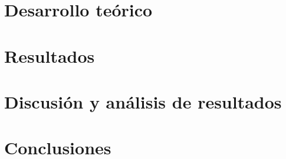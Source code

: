 \documentclass[10pt, letterpaper]{report}
\def\CAPteoria{}
\def\CAPresultados{}
\def\CAPdiscusion{}
\newcommand{\defaultparformat}[1]{
	{\setlength{\parskip}{2ex}
    }
}
\begin{document}
%     	

\ifdefined\CAPteoria
	\newpage
	\chapter{Desarrollo teórico}
	\ifdefined\parpordefecto
    	\defaultparformat{teoria}
    \else
    	
    \fi  
\fi

\newpage
\ifdefined\parpordefecto
	\defaultparformat{capitulos}
\else
	
\fi

\ifdefined\CAPresultados
	\newpage
	\chapter{Resultados}
	\ifdefined\parpordefecto
    	\defaultparformat{resultados}
    \else
    	
    \fi  
\fi

\ifdefined\CAPdiscusion
	\newpage
	\chapter{Discusión y análisis de resultados}
	\ifdefined\parpordefecto
    	\defaultparformat{discusion}
    \else
    	
    \fi  
\fi

\ifdefined\CAPconclusiones
	\newpage
	\chapter{Conclusiones}
	\ifdefined\parpordefecto
		\defaultparformat{conclusiones}
	\else
		
	\fi
\fi

\ifdefined\CAPrecomendaciones
	\newpage
\end{document}
